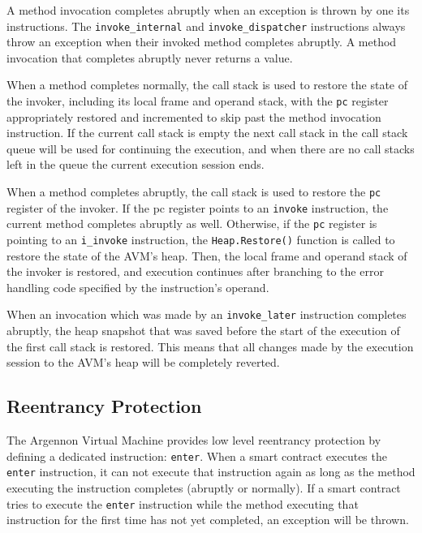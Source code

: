 A method invocation completes abruptly when an exception is thrown by one its instructions.
The \texttt{invoke\_internal} and \texttt{invoke\_dispatcher} instructions
always throw an exception when their invoked method completes abruptly. A
method invocation that completes abruptly never returns a value.

When a method completes normally, the call stack is used to restore the state of the invoker,
including its local frame and operand stack, with the \texttt{pc} register appropriately restored and incremented
to skip past the method invocation instruction. If the current call stack is empty the next call stack in the call
stack queue will be used for continuing the execution, and when there are no call stacks left in the queue the
current execution session ends.

When a method completes abruptly, the call stack is used to restore the \texttt{pc} register of the invoker. If the pc
register points to an \texttt{invoke} instruction, the current method completes abruptly as well. Otherwise, if
the \texttt{pc} register is pointing to an \texttt{i\_invoke} instruction, the \texttt{Heap.Restore()} function is
called to restore the state of the AVM's heap. Then, the
local frame and operand stack of the invoker is restored, and execution continues after branching to the error handling
code specified by the instruction's operand.

When an invocation which was made by an \texttt{invoke\_later} instruction completes abruptly, the
heap snapshot that was saved before the start of the
execution of the first call stack is restored. This means
that all changes made by the execution session to the AVM's heap will be completely reverted.

\subsection{Reentrancy Protection}\label{subsec:reentrancy}

The Argennon Virtual Machine provides low level reentrancy protection by defining a dedicated
instruction: \texttt{enter}. When a smart contract executes the \texttt{enter} instruction, it
can not execute that instruction again as long
as the method executing the instruction completes (abruptly or normally). If a smart contract tries to execute
the \texttt{enter} instruction while the method executing that instruction for the first time has not yet completed,
an exception will be thrown.

